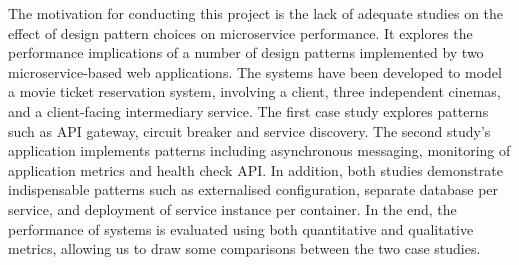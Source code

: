 The motivation for conducting this project is the lack of adequate studies on the effect of design pattern choices on microservice performance. It explores the performance implications of a number of design patterns implemented by two microservice-based web applications. The systems have been developed to model a movie ticket reservation system, involving a client, three independent cinemas, and a client-facing intermediary service. The first case study explores patterns such as API gateway, circuit breaker and service discovery. The second study's application implements patterns including asynchronous messaging, monitoring of application metrics and health check API. In addition, both studies demonstrate indispensable patterns such as externalised configuration, separate database per service, and deployment of service instance per container. In the end, the performance of systems is evaluated using both quantitative and qualitative metrics, allowing us to draw some comparisons between the two case studies.

